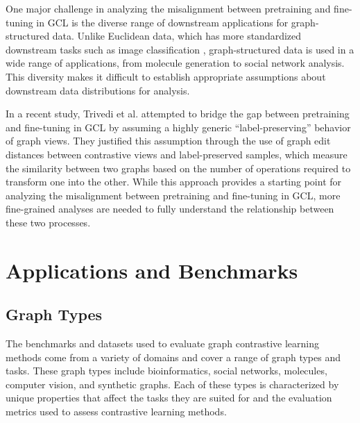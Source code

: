 \documentclass[11pt]{article}
\begin{document}
One major challenge in analyzing the misalignment between pretraining and fine-tuning in GCL is the diverse range of downstream applications for graph-structured data. Unlike Euclidean data, which has more standardized downstream tasks such as image classification \cite{du2020few, haochen2021provable}, graph-structured data is used in a wide range of applications, from molecule generation to social network analysis. This diversity makes it difficult to establish appropriate assumptions about downstream data distributions for analysis.

In a recent study, Trivedi et al. \cite{trivedi2022analyzing} attempted to bridge the gap between pretraining and fine-tuning in GCL by assuming a highly generic ``label-preserving'' behavior of graph views. They justified this assumption through the use of graph edit distances between contrastive views and label-preserved samples, which measure the similarity between two graphs based on the number of operations required to transform one into the other. While this approach provides a starting point for analyzing the misalignment between pretraining and fine-tuning in GCL, more fine-grained analyses are needed to fully understand the relationship between these two processes.


\section{Applications and Benchmarks}
\label{sec:4}
\subsection{Graph Types}
The benchmarks and datasets used to evaluate graph contrastive learning methods come from a variety of domains and cover a range of graph types and tasks. These graph types include bioinformatics, social networks, molecules, computer vision, and synthetic graphs. Each of these types is characterized by unique properties that affect the tasks they are suited for and the evaluation metrics used to assess contrastive learning methods.
\end{document}
